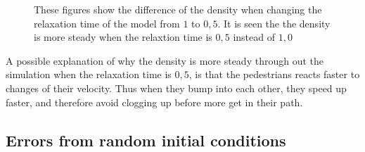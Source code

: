 \begin{figure}[h]
\centering
{}
\caption{These figures show the difference of the density when changing the relaxation time of the model from $1$ to $0,5$.
It is seen the the density is more steady when the relaxtion time is $0,5$ instead of $1,0$}
\label{fig:comparison_of_timestep}
\end{figure}

A possible explanation of why the density is more steady through out the simulation when the relaxation time is $0,5$,
is that the pedestrians reacts faster to changes of their velocity. Thus when they bump into each other, they speed up
faster, and therefore avoid clogging up before more get in their path.

\subsection{Errors from random initial conditions}
\label{sec:random-errors}
